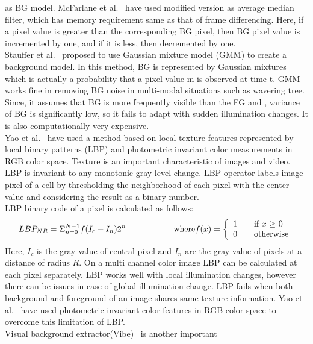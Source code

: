 as BG model.  McFarlane et al.~\cite{14} have used modified version as
average median filter, which has memory requirement same as that of
frame differencing.  Here, if a pixel value is greater than the
corresponding BG pixel, then BG pixel value is incremented by one, and
if it is less, then decremented by one.\\
\indent  Stauffer et al.~\cite{15} proposed to use Gaussian mixture
model (GMM) to create a background model. In this method, BG is
represented by Gaussian mixtures which is actually a probability that a
pixel value m is observed at time t. GMM works fine in removing BG
noise in multi-modal situations such as wavering tree. Since, it assumes
that BG is more frequently visible than the FG and , variance of BG is
significantly low, so it fails to adapt with sudden illumination
changes. It is also computationally very expensive.\\ 
\indent Yao et al.~\cite{11} have used a method based on local texture
features represented by local binary patterns (LBP) and photometric
invariant color measurements in RGB color space. Texture is an important
characteristic of images and video. LBP is invariant to any monotonic
gray level change.  LBP operator labels image pixel of a cell by
thresholding the neighborhood of each pixel with the center value and
considering the result as a binary number.\\
\indent LBP binary code of a pixel is calculated as follows:
\begin{equation}
LBP_{NR} = \Sigma _{n = 0} ^{N - 1} f(I_c - I_n) 2^n \hspace{20 mm} \mathrm{where} f(x) = \left\{ 
  \begin{array}{l l}
     1 & \quad \text{if $x$ $\geq$  $0$}\\
     0 & \quad \text{otherwise}
   \end{array} \right.
\end{equation}
\indent Here, $I_c$ is the gray value of central pixel and $I_n$ are the gray
value of pixels at a distance of radius $R$.  On a multi channel color
image LBP can be calculated at each pixel separately. LBP works well with
local illumination changes, however there can be issues in case of
global illumination change. LBP fails when both background and foreground
of an image shares same texture information. Yao et al.~\cite{11} have used
photometric invariant color features in RGB color space to overcome this
limitation of LBP.\\
\indent Visual background extractor(Vibe)~\cite{9} is another important
